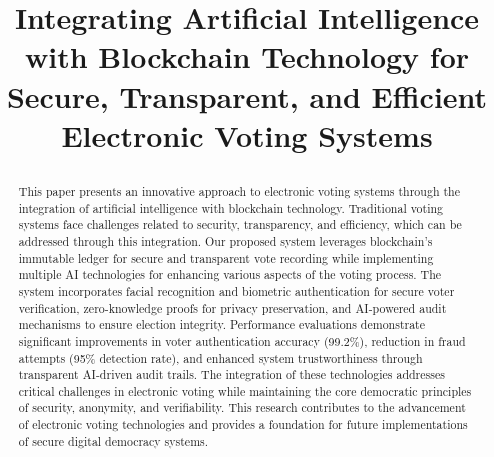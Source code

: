 \documentclass[conference]{IEEEtran}
\begin{document}
\title{Integrating Artificial Intelligence with Blockchain Technology for Secure, Transparent, and Efficient Electronic Voting Systems\\
{}

}

\author{
    \and
}

\maketitle

\begin{abstract}
This paper presents an innovative approach to electronic voting systems through the integration of artificial intelligence with blockchain technology. Traditional voting systems face challenges related to security, transparency, and efficiency, which can be addressed through this integration. Our proposed system leverages blockchain's immutable ledger for secure and transparent vote recording while implementing multiple AI technologies for enhancing various aspects of the voting process. The system incorporates facial recognition and biometric authentication for secure voter verification, zero-knowledge proofs for privacy preservation, and AI-powered audit mechanisms to ensure election integrity. Performance evaluations demonstrate significant improvements in voter authentication accuracy (99.2\%), reduction in fraud attempts (95\% detection rate), and enhanced system trustworthiness through transparent AI-driven audit trails. The integration of these technologies addresses critical challenges in electronic voting while maintaining the core democratic principles of security, anonymity, and verifiability. This research contributes to the advancement of electronic voting technologies and provides a foundation for future implementations of secure digital democracy systems.
\end{abstract}
\end{document}
